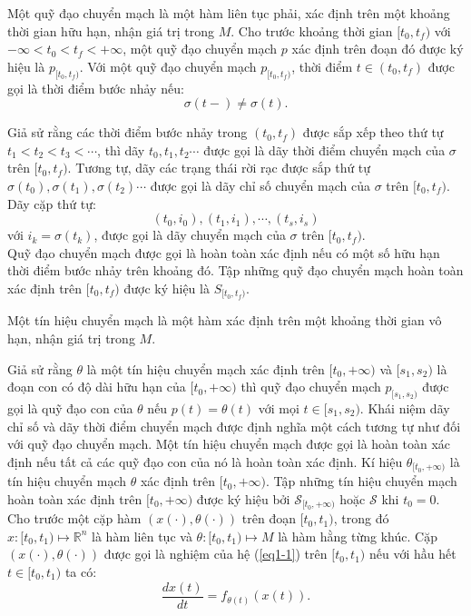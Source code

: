 \documentclass[14pt,a4paper,oneside]{report}		%
\theoremstyle{definition}
\begin{document}
Một quỹ đạo chuyển mạch là một hàm liên tục phải, xác định trên một khoảng thời gian hữu hạn, nhận giá trị trong $M$.
Cho trước khoảng thời gian $[t_0,t_f)$ với $-\infty < t_0 < t_f < +\infty$, một quỹ đạo chuyển mạch $p$ xác định trên đoạn đó được ký hiệu là $p_{[t_0,t_f)}$. Với một quỹ đạo chuyển mạch $p_{[t_0,t_f)}$, thời điểm $t\in (t_0,t_f)$ được gọi là thời điểm bước nhảy nếu:
$$\sigma(t-)\neq\sigma(t).$$

Giả sử rằng các thời điểm bước nhảy trong $(t_0, t_f)$ được sắp xếp theo thứ tự $t_1 < t_2 < t_3 < \cdots$, thì dãy $t_0,t_1,t_2\cdots$ được gọi là dãy thời điểm chuyển mạch của $\sigma$ trên $[t_0,t_f)$. Tương tự, dãy các trạng thái rời rạc được sắp thứ tự $\sigma(t_0),\sigma(t_1),\sigma(t_2)\cdots$ được gọi là dãy chỉ số chuyển mạch của $\sigma$ trên $[t_0,t_f)$. Dãy cặp thứ tự:
$$(t_0,i_0),(t_1,i_1),\cdots,(t_s,i_s)$$
với $i_k=\sigma(t_k)$, được gọi là dãy chuyển mạch của $\sigma$ trên $[t_0,t_f)$.\\
Quỹ đạo chuyển mạch được gọi là hoàn toàn xác định nếu có một số hữu hạn thời điểm bước nhảy trên khoảng đó. Tập những quỹ đạo chuyển mạch hoàn toàn xác định trên $[t_0,t_f)$ được ký hiệu là $S_{[t_0,t_f)}$.

Một tín hiệu chuyển mạch là một hàm xác định trên một khoảng thời gian vô hạn, nhận giá trị trong $M$.

Giả sử rằng $\theta$ là một tín hiệu chuyển mạch xác định trên $[t_0,+\infty)$ và $[s_1,s_2)$ là đoạn con có độ dài hữu hạn của $[t_0,+\infty)$ thì quỹ đạo chuyển mạch $p_{[s_1,s_2)}$ được gọi là quỹ đạo con của $\theta$ nếu $p(t)=\theta(t)$ với mọi $t\in[s_1,s_2)$. Khái niệm dãy chỉ số và dãy thời điểm chuyển mạch được định nghĩa một cách tương tự như đối với quỹ đạo chuyển mạch.
Một tín hiệu chuyển mạch được gọi là hoàn toàn xác định nếu tất cả các quỹ đạo con của nó là hoàn toàn xác định. Kí hiệu $\theta_{[t_0,+\infty)}$ là tín hiệu chuyển mạch $\theta$ xác định trên $[t_0,+\infty)$. Tập những tín hiệu chuyển mạch hoàn toàn xác định trên $[t_0,+\infty)$ được ký hiệu bởi $\mathcal{S}_{[t_0,+\infty)}$ hoặc $\mathcal{S}$ khi $t_0=0$.\\

Cho trước một cặp hàm $(x(\cdot),\theta(\cdot))$ trên đoạn $[t_0,t_1)$, trong đó $x:[t_0,t_1)\mapsto\mathbb{R}^n$ là hàm liên tục và $\theta:[t_0,t_1)\mapsto M$ là hàm hằng từng khúc. Cặp $(x(\cdot),\theta(\cdot))$ được gọi là nghiệm của hệ (\ref{eq1-1}) trên $[t_0,t_1)$ nếu với hầu hết $t\in [t_0,t_1)$ ta có:
$$\frac{dx(t)}{dt}=f_{\theta(t)}(x(t)).$$
\end{document}
